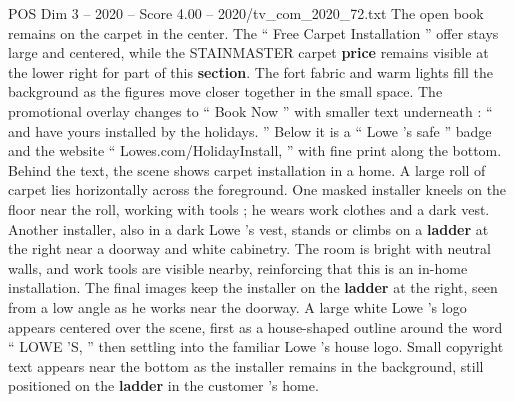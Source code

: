 \begin{textsample}{POS Dim 3 – 2020 – Score 4.00 – 2020/tv\_com\_2020\_72.txt}
The open book remains on the carpet in the center.
The “ Free Carpet Installation ” offer stays large and centered, while the STAINMASTER carpet \textbf{price} remains visible at the lower right for part of this \textbf{section}.
The fort fabric and warm lights fill the background as the figures move closer together in the small space.
The promotional overlay changes to “ Book Now ” with smaller text underneath : “ and have yours installed by the holidays. ” Below it is a “ Lowe ’s safe ” badge and the website “ Lowes.com/HolidayInstall, ” with fine print along the bottom.
Behind the text, the scene shows carpet installation in a home.
A large roll of carpet lies horizontally across the foreground.
One masked installer kneels on the floor near the roll, working with tools ; he wears work clothes and a dark vest.
Another installer, also in a dark Lowe ’s vest, stands or climbs on a \textbf{ladder} at the right near a doorway and white cabinetry.
The room is bright with neutral walls, and work tools are visible nearby, reinforcing that this is an in-home installation.
The final images keep the installer on the \textbf{ladder} at the right, seen from a low angle as he works near the doorway.
A large white Lowe ’s logo appears centered over the scene, first as a house-shaped outline around the word “ LOWE ’S, ” then settling into the familiar Lowe ’s house logo.
Small copyright text appears near the bottom as the installer remains in the background, still positioned on the \textbf{ladder} in the customer ’s home.

\end{textsample}
